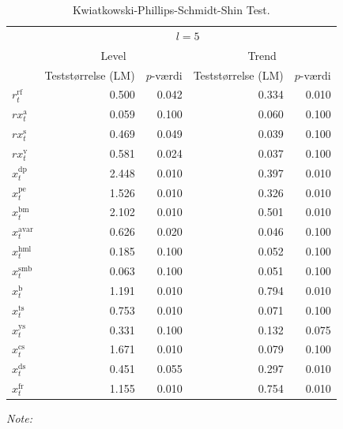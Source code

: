 \documentclass[
  a4paper,
  oneside]{memoir}
\begin{document}
\begin{table}[!h]

\caption{\label{tab:STAT-KPSS}Kwiatkowski-Phillips-Schmidt-Shin Test.}
\centering
\begin{threeparttable}
\begin{tabular}[t]{lrrrr}
\toprule
\multicolumn{1}{c}{ } & \multicolumn{4}{c}{$l=5$} \\
\cmidrule(l{3pt}r{3pt}){2-5}
\multicolumn{1}{c}{ } & \multicolumn{2}{c}{Level} & \multicolumn{2}{c}{Trend} \\
\cmidrule(l{3pt}r{3pt}){2-3} \cmidrule(l{3pt}r{3pt}){4-5}
  & Teststørrelse (LM) & $p$-værdi & Teststørrelse (LM) & $p$-værdi\\
\midrule
\rowcolor{gray!6}  $r_t^{\text{rf}}$ & 0.500 & 0.042 & 0.334 & 0.010\\
$rx_t^{\text{a}}$ & 0.059 & 0.100 & 0.060 & 0.100\\
\rowcolor{gray!6}  $rx_t^{\text{s}}$ & 0.469 & 0.049 & 0.039 & 0.100\\
$rx_t^{\text{v}}$ & 0.581 & 0.024 & 0.037 & 0.100\\
\rowcolor{gray!6}  $x_t^{\text{dp}}$ & 2.448 & 0.010 & 0.397 & 0.010\\
$x_t^{\text{pe}}$ & 1.526 & 0.010 & 0.326 & 0.010\\
\rowcolor{gray!6}  $x_t^{\text{bm}}$ & 2.102 & 0.010 & 0.501 & 0.010\\
$x_t^{\text{avar}}$ & 0.626 & 0.020 & 0.046 & 0.100\\
\rowcolor{gray!6}  $x_t^{\text{hml}}$ & 0.185 & 0.100 & 0.052 & 0.100\\
$x_t^{\text{smb}}$ & 0.063 & 0.100 & 0.051 & 0.100\\
\rowcolor{gray!6}  $x_t^{\text{b}}$ & 1.191 & 0.010 & 0.794 & 0.010\\
$x_t^{\text{ts}}$ & 0.753 & 0.010 & 0.071 & 0.100\\
\rowcolor{gray!6}  $x_t^{\text{ys}}$ & 0.331 & 0.100 & 0.132 & 0.075\\
$x_t^{\text{cs}}$ & 1.671 & 0.010 & 0.079 & 0.100\\
\rowcolor{gray!6}  $x_t^{\text{ds}}$ & 0.451 & 0.055 & 0.297 & 0.010\\
$x_t^{\text{fr}}$ & 1.155 & 0.010 & 0.754 & 0.010\\
\bottomrule
\end{tabular}
\begin{tablenotes}
\item \textit{Note: } 

\end{tablenotes}
\end{threeparttable}
\end{table}
\end{document}
